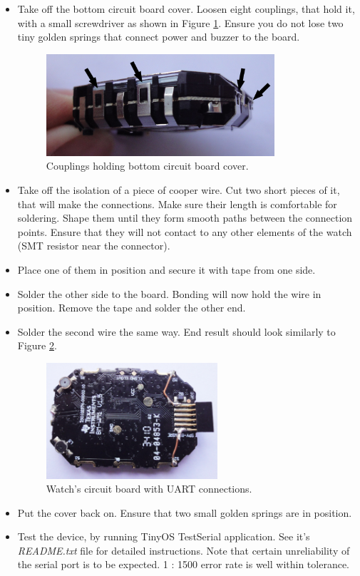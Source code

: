 \begin{itemize}
  \item Take off the bottom circuit board cover. Loosen eight
    couplings, that hold it, with a small screwdriver as shown in
    Figure \ref{fig:chronos_cover_off}. Ensure you do not lose two
    tiny golden springs that connect power and buzzer to the board.
    \begin{figure}[h]
      \centering
      \includegraphics[width=0.8\textwidth]{img/chronos_cover_off.jpg}
      \caption{Couplings holding bottom circuit board cover.}
      \label{fig:chronos_cover_off}
    \end{figure}
  \item Take off the isolation of a piece of cooper wire. Cut two
    short pieces of it, that will make the connections.  Make sure
    their length is comfortable for soldering. Shape them until they
    form smooth paths between the connection points. Ensure that they
    will not contact to any other elements of the watch (SMT resistor
    near the connector).
  \item Place one of them in position and secure it with tape
    from one side.
  \item Solder the other side to the board. Bonding will now hold the
    wire in position. Remove the tape and solder the other end.
  \item Solder the second wire the same way. End result should
    look similarly to Figure \ref{fig:chronos_with_wires}.
    \begin{figure}[h]
      \centering
      \includegraphics[width=0.6\textwidth]{img/chronos_with_wires.jpg}
      \caption{Watch's circuit board with UART connections.}
      \label{fig:chronos_with_wires}
    \end{figure}
  \item Put the cover back on. Ensure that two small golden springs
    are in position.
  \item Test the device, by running TinyOS TestSerial application. See
    it's \emph{README.txt} file for detailed instructions.  Note that
    certain unreliability of the serial port is to be expected.  1 :
    1500 error rate is well within tolerance.
\end{itemize}

